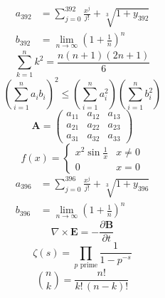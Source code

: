 \documentclass[11pt]{article}
\begin{document}
\begin{align}
  a_{392} &= \sum_{j=0}^{392} \frac{x^j}{j!} + \sqrt[3]{1+y_{392}} \\
  b_{392} &= \lim_{n\to\infty} \left(1+\frac{1}{n}\right)^{n}
\end{align}
\begin{equation}
\sum_{k=1}^{n} k^2 = \frac{n(n+1)(2n+1)}{6}
\end{equation}
\begin{equation}
\left( \sum_{i=1}^n a_i b_i \right)^2 \le \left(\sum_{i=1}^n a_i^2\right)\left(\sum_{i=1}^n b_i^2\right)
\end{equation}
\begin{equation}
\mathbf{A} = \begin{pmatrix} a_{11} & a_{12} & a_{13} \\ a_{21} & a_{22} & a_{23} \\ a_{31} & a_{32} & a_{33} \end{pmatrix}
\end{equation}
\begin{equation}
f(x) = \begin{cases} x^2 \sin\frac{1}{x} & x \ne 0 \\ 0 & x = 0 \end{cases}
\end{equation}
\begin{align}
  a_{396} &= \sum_{j=0}^{396} \frac{x^j}{j!} + \sqrt[3]{1+y_{396}} \\
  b_{396} &= \lim_{n\to\infty} \left(1+\frac{1}{n}\right)^{n}
\end{align}
\begin{equation}
\nabla \times \mathbf{E} = -\frac{\partial \mathbf{B}}{\partial t}
\end{equation}
\begin{equation}
\zeta(s) = \prod_{p \text{ prime}} \frac{1}{1 - p^{-s}}
\end{equation}
\begin{equation}
\binom{n}{k} = \frac{n!}{k!\,(n-k)!}
\end{equation}
\end{document}
